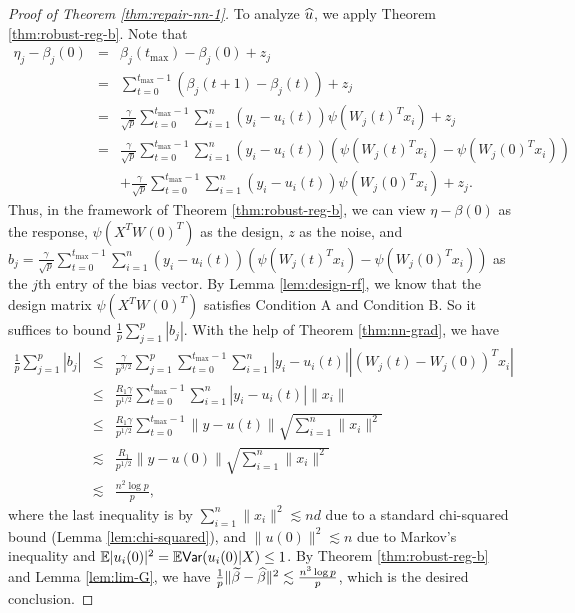 \begin{proof}[Proof of Theorem \ref{thm:repair-nn-1}]
To analyze $\widehat{u}$, we apply Theorem \ref{thm:robust-reg-b}. Note that
\begin{eqnarray*}
\eta_j - \beta_j(0) &=& \beta_j(t_{\max}) - \beta_j(0) +z_j \\
&=& \sum_{t=0}^{t_{\max}-1}\left(\beta_j(t+1)-\beta_j(t)\right) + z_j \\
&=& \frac{\gamma}{\sqrt{p}}\sum_{t=0}^{t_{\max}-1}\sum_{i=1}^n(y_i-u_i(t))\psi(W_j(t)^Tx_i) + z_j \\
&=& \frac{\gamma}{\sqrt{p}}\sum_{t=0}^{t_{\max}-1}\sum_{i=1}^n(y_i-u_i(t))(\psi(W_j(t)^Tx_i)-\psi(W_j(0)^Tx_i)) \\
&& + \frac{\gamma}{\sqrt{p}}\sum_{t=0}^{t_{\max}-1}\sum_{i=1}^n(y_i-u_i(t))\psi(W_j(0)^Tx_i) + z_j.
\end{eqnarray*}
Thus, in the framework of Theorem \ref{thm:robust-reg-b}, we can view $\eta-\beta(0)$ as the response, $\psi(X^TW(0)^T)$ as the design, $z$ as the noise, and $b_j=\frac{\gamma}{\sqrt{p}}\sum_{t=0}^{t_{\max}-1}\sum_{i=1}^n(y_i-u_i(t))(\psi(W_j(t)^Tx_i)-\psi(W_j(0)^Tx_i))$ as the $j$th entry of the bias vector. By Lemma \ref{lem:design-rf}, we know that the design matrix $\psi(X^TW(0)^T)$ satisfies Condition A and Condition B. So it suffices to bound $\frac{1}{p}\sum_{j=1}^p|b_j|$. With the help of Theorem \ref{thm:nn-grad}, we have
\begin{eqnarray*}
\frac{1}{p}\sum_{j=1}^p|b_j| &\leq& \frac{\gamma}{p^{3/2}}\sum_{j=1}^p\sum_{t=0}^{t_{\max}-1}\sum_{i=1}^n|y_i-u_i(t)||(W_j(t)-W_j(0))^Tx_i| \\
&\leq& \frac{R_1\gamma}{p^{1/2}}\sum_{t=0}^{t_{\max}-1}\sum_{i=1}^n|y_i-u_i(t)|\|x_i\| \\
&\leq& \frac{R_1\gamma}{p^{1/2}}\sum_{t=0}^{t_{\max}-1}\|y-u(t)\|\sqrt{\sum_{i=1}^n\|x_i\|^2} \\
&\lesssim& \frac{R_1}{p^{1/2}}\|y-u(0)\|\sqrt{\sum_{i=1}^n\|x_i\|^2} \\
&\lesssim& \frac{n^2\log p}{p},
\end{eqnarray*}
where the last inequality is by $\sum_{i=1}^n\|x_i\|^2\lesssim nd$ due to a standard chi-squared bound (Lemma \ref{lem:chi-squared}), and $\|u(0)\|^2\lesssim n$ due to Markov's inequality and $\mathbb{E}|u_i(0)|^2 = \mathbb{E}\textsf{Var}(u_i(0)|X) \leq 1$. By Theorem \ref{thm:robust-reg-b} and Lemma \ref{lem:lim-G}, we have $\frac{1}{p}\|\widetilde{\beta}-\widehat{\beta}\|^2 \lesssim \frac{n^3\log p}{p}$, which is the desired conclusion.
\end{proof}

